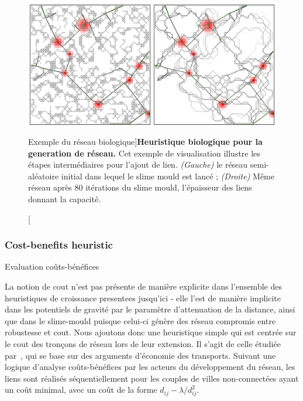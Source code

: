 \begin{figure}
\includegraphics[width=\linewidth]{Figures/Final/7-1-1-fig-networkgrowth-bioexample.jpg}
\caption[Biological Network Example][Exemple du réseau biologique]{}{\textbf{Heuristique biologique pour la generation de réseau.} Cet exemple de visualisation illustre les étapes intermédiaires pour l'ajout de lien. \textit{(Gauche)} le réseau semi-aléatoire initial dans lequel le slime mould est lancé ; \textit{(Droite)} Même réseau après 80 itérations du slime mould, l'épaisseur des liens donnant la capacité.\label{fig:networkgrowth:bioexample}}
\end{figure}


\subsubsection{Cost-benefits heuristic}{Evaluation coûts-bénéfices}

La notion de cout n'est pas présente de manière explicite dans l'ensemble des heuristiques de croissance presentees jusqu'ici - elle l'est de manière implicite dans les potentiels de gravité par le paramètre d'attenuation de la distance, ainsi que dans le slime-mould puisque celui-ci génère des réseau compromis entre robustesse et cout. Nous ajoutons donc une heuristique simple qui est centrée sur le cout des tronçons de réseau lors de leur extension. Il s'agit de celle étudiée par~\cite{louf2013emergence}, qui se base sur des arguments d'économie des transports. Suivant une logique d'analyse coûts-bénéfices par les acteurs du développement du réseau, les liens sont réalisés séquentiellement pour les couples de villes non-connectées ayant un coût minimal, avec un coût de la forme $d_{ij} - \lambda / d_{ij}^2$.


